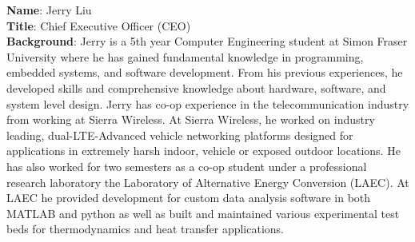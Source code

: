 \bigskip
\bigskip
\textbf{Name}: Jerry Liu \\
\medskip
\textbf{Title}: Chief Executive Officer (CEO) \\
\medskip
\textbf{Background}: Jerry is a 5th year Computer Engineering student at Simon Fraser University where he has gained fundamental knowledge in programming, embedded systems, and  software development. From his previous experiences, he developed skills and comprehensive knowledge about hardware, software, and system level design. Jerry has co-op experience in the telecommunication industry from working at Sierra Wireless. At Sierra Wireless, he worked on industry leading, dual-LTE-Advanced vehicle networking platforms designed for applications in extremely harsh indoor, vehicle or exposed outdoor locations. He has also worked for two semesters as a co-op student under a professional research laboratory the Laboratory of Alternative Energy Conversion (LAEC). At LAEC he provided development for custom data analysis software in both MATLAB and python as well as built and maintained various experimental test beds for thermodynamics and heat transfer applications.

